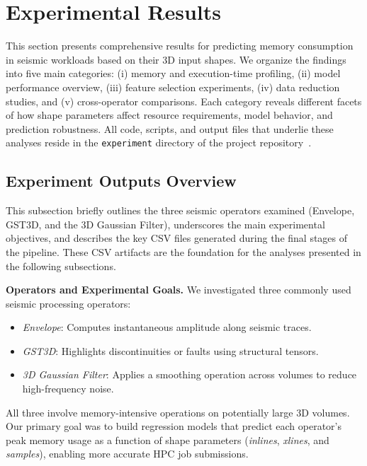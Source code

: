 \section{Experimental Results}
\label{sec:pmc-results}

This section presents comprehensive results for predicting memory consumption in seismic workloads based on their \ac{3D} input shapes.
We organize the findings into five main categories: (i) memory and execution-time profiling, (ii) model performance overview, (iii) feature selection experiments, (iv) data reduction studies, and (v) cross-operator comparisons.
Each category reveals different facets of how shape parameters affect resource requirements, model behavior, and prediction robustness.
All code, scripts, and output files that underlie these analyses reside in the \texttt{experiment} directory of the project repository~\cite{delucca2025experiment2results}.

\subsection{Experiment Outputs Overview}
\label{subsec:pmc-results-experiment-outputs-overview}

This subsection briefly outlines the three seismic operators examined (Envelope, \ac{GST3D}, and the 3D Gaussian Filter), underscores the main experimental objectives, and describes the key \ac{CSV} files generated during the final stages of the pipeline.
These \ac{CSV} artifacts are the foundation for the analyses presented in the following subsections.

\vspace{1em}
\noindent
\textbf{Operators and Experimental Goals.}
We investigated three commonly used seismic processing operators:
\begin{itemize}
    \item \emph{Envelope}: Computes instantaneous amplitude along seismic traces.
    \item \emph{\ac{GST3D}}: Highlights discontinuities or faults using structural tensors.
    \item \emph{3D Gaussian Filter}: Applies a smoothing operation across volumes to reduce high-frequency noise.
\end{itemize}
All three involve memory-intensive operations on potentially large \ac{3D} volumes.
Our primary goal was to build regression models that predict each operator’s peak memory usage as a function of shape parameters (\textit{inlines}, \textit{xlines}, and \textit{samples}), enabling more accurate \ac{HPC} job submissions.

